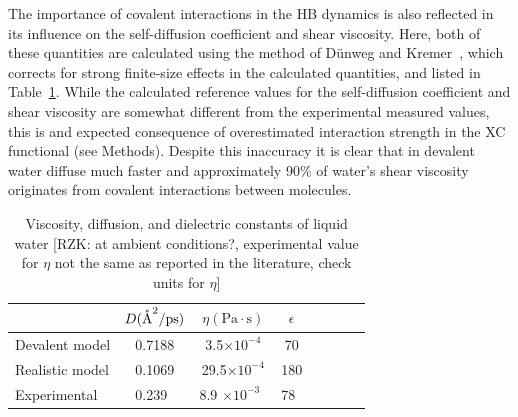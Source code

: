 \documentclass[aps,prl,reprint,amsmath,amssymb]{revtex4-1}
\begin{document}
The importance of covalent interactions in the HB dynamics is also reflected in its influence on the self-diffusion coefficient and shear viscosity. 
Here, both of these quantities are calculated using the method of D\"unweg and Kremer~\cite{dunweg1993molecular}, which corrects for strong finite-size effects in the calculated quantities, and listed in Table~\ref{Tab:dfs}. 
While the calculated reference values for the self-diffusion coefficient and shear viscosity are somewhat different from the experimental measured values, this is and expected consequence of overestimated interaction strength in the XC functional (see Methods). 
Despite this inaccuracy it is clear that in devalent water diffuse much faster and approximately 90\% of water's shear viscosity originates from covalent interactions between molecules.

\begin{table}
\caption{Viscosity, diffusion, and dielectric constants of liquid water [RZK: at ambient conditions?, experimental value for $\eta$ not the same as reported in the literature, check units for $\eta$]}\label{Tab:dfs}
\begin{tabular}{l*{6}{c}r}
\hline
               & $D (\mathring{\text{A}}^2/\text{ps})$ & $\eta (\text{Pa}\cdot \text{s})$ & $\epsilon$ \\
\hline
Devalent model                & 0.7188 & 3.5$\times 10^{-4}$ & 70 \\
%
Realistic model              & 0.1069 & 29.5$\times 10^{-4}$ & 180 \\
%
Experimental            & 0.239~\cite{RZK-insert-ref}  & 8.9 $\times 10^{-3} $~\cite{RZK-ref} & 78~\cite{RZK-ref}
\end{tabular}
\end{table}
 
\end{document}
